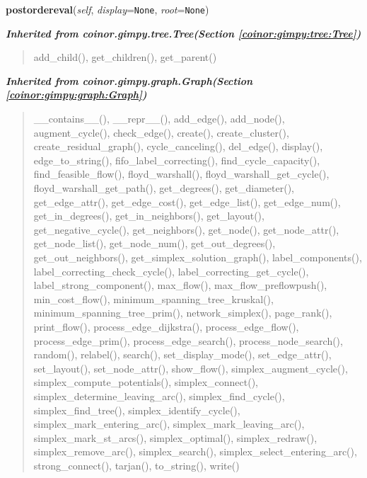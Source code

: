     \vspace{0.5ex}

\hspace{.8\funcindent}\begin{boxedminipage}{\funcwidth}

    \raggedright \textbf{postordereval}(\textit{self}, \textit{display}={\tt None}, \textit{root}={\tt None})

\setlength{\parskip}{2ex}
\setlength{\parskip}{1ex}
    \end{boxedminipage}


\large{\textbf{\textit{Inherited from coinor.gimpy.tree.Tree\textit{(Section \ref{coinor:gimpy:tree:Tree})}}}}

\begin{quote}
add\_child(), get\_children(), get\_parent()
\end{quote}

\large{\textbf{\textit{Inherited from coinor.gimpy.graph.Graph\textit{(Section \ref{coinor:gimpy:graph:Graph})}}}}

\begin{quote}
\_\_contains\_\_(), \_\_repr\_\_(), add\_edge(), add\_node(), augment\_cycle(), check\_edge(), create(), create\_cluster(), create\_residual\_graph(), cycle\_canceling(), del\_edge(), display(), edge\_to\_string(), fifo\_label\_correcting(), find\_cycle\_capacity(), find\_feasible\_flow(), floyd\_warshall(), floyd\_warshall\_get\_cycle(), floyd\_warshall\_get\_path(), get\_degrees(), get\_diameter(), get\_edge\_attr(), get\_edge\_cost(), get\_edge\_list(), get\_edge\_num(), get\_in\_degrees(), get\_in\_neighbors(), get\_layout(), get\_negative\_cycle(), get\_neighbors(), get\_node(), get\_node\_attr(), get\_node\_list(), get\_node\_num(), get\_out\_degrees(), get\_out\_neighbors(), get\_simplex\_solution\_graph(), label\_components(), label\_correcting\_check\_cycle(), label\_correcting\_get\_cycle(), label\_strong\_component(), max\_flow(), max\_flow\_preflowpush(), min\_cost\_flow(), minimum\_spanning\_tree\_kruskal(), minimum\_spanning\_tree\_prim(), network\_simplex(), page\_rank(), print\_flow(), process\_edge\_dijkstra(), process\_edge\_flow(), process\_edge\_prim(), process\_edge\_search(), process\_node\_search(), random(), relabel(), search(), set\_display\_mode(), set\_edge\_attr(), set\_layout(), set\_node\_attr(), show\_flow(), simplex\_augment\_cycle(), simplex\_compute\_potentials(), simplex\_connect(), simplex\_determine\_leaving\_arc(), simplex\_find\_cycle(), simplex\_find\_tree(), simplex\_identify\_cycle(), simplex\_mark\_entering\_arc(), simplex\_mark\_leaving\_arc(), simplex\_mark\_st\_arcs(), simplex\_optimal(), simplex\_redraw(), simplex\_remove\_arc(), simplex\_search(), simplex\_select\_entering\_arc(), strong\_connect(), tarjan(), to\_string(), write()
\end{quote}

